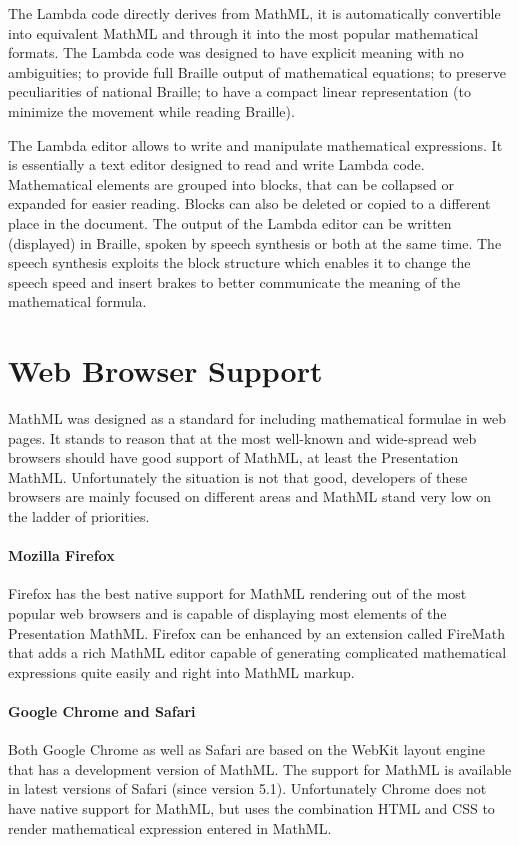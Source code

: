 \documentclass[11pt,oneside,final]{fithesis2}
\begin{document}
The Lambda code directly derives from MathML, it is automatically convertible into equivalent MathML and through it into the most popular mathematical formats. The Lambda code was designed to have explicit meaning with no ambiguities; to provide full Braille output of mathematical equations; to preserve peculiarities of national Braille; to have a compact linear representation (to minimize the movement while reading Braille).

The Lambda editor allows to write and manipulate mathematical expressions. It is essentially a text editor designed to read and write Lambda code. Mathematical elements are grouped into blocks, that can be collapsed or expanded for easier reading. Blocks can also be deleted or copied to a different place in the document. The output of the Lambda editor can be written (displayed) in Braille, spoken by speech synthesis or both at the same time. The speech synthesis exploits the block structure which enables it to change the speech speed and insert brakes to better communicate the meaning of the mathematical formula. 

\section{Web Browser Support}
MathML was designed as a standard for including mathematical formulae in web pages. It stands to reason that at the most well-known and wide-spread web browsers should have good support of MathML, at least the Presentation MathML. Unfortunately the situation is not that good, developers of these browsers are mainly focused on different areas and MathML stand very low on the ladder of priorities.

\paragraph*{Mozilla Firefox} 
Firefox has the best native support for MathML rendering out of the most popular web browsers and is capable of displaying most elements of the Presentation MathML. Firefox can be enhanced by an extension called FireMath that adds a rich MathML editor capable of generating complicated mathematical expressions quite easily and right into MathML markup.

\paragraph*{Google Chrome and Safari}
Both Google Chrome as well as Safari are based on the WebKit layout engine that has a development version of MathML. The support for MathML is available in latest versions of Safari (since version 5.1). Unfortunately Chrome does not have native support for MathML, but uses the combination HTML and CSS to render mathematical expression entered in MathML.
\end{document}

